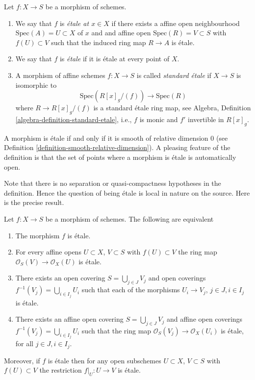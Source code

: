\begin{definition}
\label{definition-etale}
Let $f : X \to S$ be a morphism of schemes.
\begin{enumerate}
\item We say that $f$ is {\it \'etale at $x \in X$} if
there exists a affine open neighbourhood $\text{Spec}(A) = U \subset X$
of $x$ and and affine open $\text{Spec}(R) = V \subset S$
with $f(U) \subset V$ such that the induced ring map
$R \to A$ is \'etale.
\item We say that $f$ is {\it \'etale} if it is \'etale at every point of $X$.
\item A morphism of affine schemes $f : X \to S$ is called
{\it standard \'etale} if $X \to S$ is isomorphic to
$$
\text{Spec}(R[x]_g/(f)) \to \text{Spec}(R)
$$
where $R \to R[x]_g/(f)$ is a standard \'etale ring map, see
Algebra, Definition \ref{algebra-definition-standard-etale},
i.e., $f$ is monic and $f'$ invertible in $R[x]_g$.
\end{enumerate}
\end{definition}

\noindent
A morphism is \'etale if and only if it is smooth of relative dimension $0$
(see Definition \ref{definition-smooth-relative-dimension}).
A pleasing feature of the definition is that the set of points
where a morphism is \'etale is automatically open.

\medskip\noindent
Note that there is no separation or quasi-compactness hypotheses in the
definition. Hence the question of being \'etale is local in nature on
the source. Here is the precise result.

\begin{lemma}
\label{lemma-etale-characterize}
Let $f : X \to S$ be a morphism of schemes.
The following are equivalent
\begin{enumerate}
\item The morphism $f$ is \'etale.
\item For every affine opens $U \subset X$, $V \subset S$
with $f(U) \subset V$ the ring map
$\mathcal{O}_S(V) \to \mathcal{O}_X(U)$ is \'etale.
\item There exists an open covering $S = \bigcup_{j \in J} V_j$
and open coverings $f^{-1}(V_j) = \bigcup_{i \in I_j} U_i$ such
that each of the morphisms $U_i \to V_j$, $j\in J, i\in I_j$
is \'etale.
\item There exists an affine open covering $S = \bigcup_{j \in J} V_j$
and affine open coverings $f^{-1}(V_j) = \bigcup_{i \in I_j} U_i$ such
that the ring map $\mathcal{O}_S(V_j) \to \mathcal{O}_X(U_i)$ is
\'etale, for all $j\in J, i\in I_j$.
\end{enumerate}
Moreover, if $f$ is \'etale then for
any open subschemes $U \subset X$, $V \subset S$ with $f(U) \subset V$
the restriction $f|_U : U \to V$ is \'etale.
\end{lemma}

